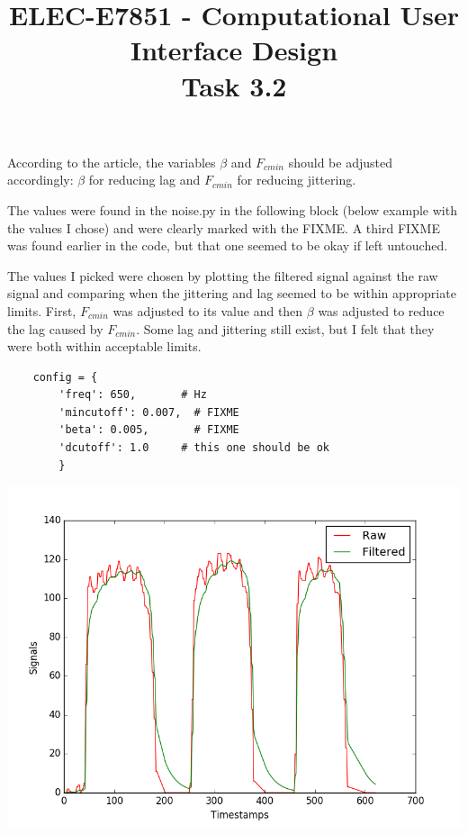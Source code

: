 \documentclass[article,11pt]{article}
\title{ELEC-E7851 - Computational User Interface Design \\ Task 3.2}
\begin{document}
\date{}
\maketitle

According to the article, the variables $ \beta $ and $ F_{cmin} $ should be adjusted accordingly: $ \beta $ for reducing lag and $ F_{cmin} $ for reducing jittering.\newline

The values were found in the noise.py in the following block (below example with the values I chose) and were clearly marked with the FIXME. A third FIXME was found earlier in the code, but that one seemed to be okay if left untouched.\newline

The values I picked were chosen by plotting the filtered signal against the raw signal and comparing when the jittering and lag seemed to be within appropriate limits. First, $ F_{cmin} $ was adjusted to its value and then $ \beta $ was adjusted to reduce the lag caused by $ F_{cmin} $. Some lag and jittering still exist, but I felt that they were both within acceptable limits.

\begin{lstlisting}
    config = {
        'freq': 650,       # Hz
        'mincutoff': 0.007,  # FIXME
        'beta': 0.005,       # FIXME
        'dcutoff': 1.0     # this one should be ok
        }
\end{lstlisting}

\includegraphics[scale=0.5]{figure_1}
\end{document}
